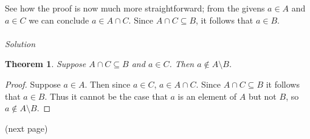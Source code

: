 \documentclass{report}
\newtheorem*{theorem}{Theorem}
\begin{document}
See how the proof is now much more straightforward; from the givens $a\in A$ and $a\in C$ we can conclude $a\in A\cap C$. Since $A\cap C\subseteq B$, it follows that $a\in B$.\\
\vspace{1mm}\\
\textit{Solution}
\begin{theorem} 
Suppose $A\cap C\subseteq B$ and $a\in C$. Then $a\notin A\setminus B$.
\end{theorem}
\begin{proof} 
Suppose $a\in A$. Then since $a\in C$, $a\in A\cap C$. Since $A\cap C\subseteq B$ it follows that $a\in B$. Thus it cannot be the case that $a$ is an element of $A$ but not $B$, so 
$a\notin A\setminus B$.
\end{proof}
\noindent(next page)\newpage
\end{document}
